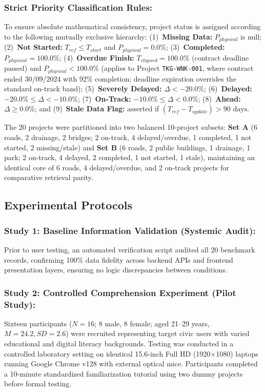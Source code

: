 \documentclass[runningheads]{llncs}
\begin{document}
\subsubsection{Strict Priority Classification Rules:}
To ensure absolute mathematical consistency, project status is assigned according to the following mutually exclusive hierarchy: (1)~\textbf{Missing Data:} $P_{physical}$ is null; (2)~\textbf{Not Started:} $T_{ref} \le T_{start}$ and $P_{physical} = 0.0\%$; (3)~\textbf{Completed:} $P_{physical} = 100.0\%$; (4)~\textbf{Overdue Finish:} $T_{elapsed} = 100.0\%$ (contract deadline passed) and $P_{physical} < 100.0\%$ (applies to Project \texttt{TKG-WNK-001}, where contract ended 30/09/2024 with 92\% completion; deadline expiration overrides the standard on-track band); (5)~\textbf{Severely Delayed:} $\Delta < -20.0\%$; (6)~\textbf{Delayed:} $-20.0\% \le \Delta < -10.0\%$; (7)~\textbf{On-Track:} $-10.0\% \le \Delta < 0.0\%$; (8)~\textbf{Ahead:} $\Delta \ge 0.0\%$; and (9)~\textbf{Stale Data Flag:} asserted if $(T_{ref} - T_{update}) > 90\text{ days}$.

The 20 projects were partitioned into two balanced 10-project subsets: \textbf{Set A} (6 roads, 2 drainage, 2 bridges; 2 on-track, 4 delayed/overdue, 1 completed, 1 not started, 2 missing/stale) and \textbf{Set B} (6 roads, 2 public buildings, 1 drainage, 1 park; 2 on-track, 4 delayed, 2 completed, 1 not started, 1 stale), maintaining an identical core of 6 roads, 4 delayed/overdue, and 2 on-track projects for comparative retrieval parity.

\subsection{Experimental Protocols}

\subsubsection{Study 1: Baseline Information Validation (Systemic Audit):}
Prior to user testing, an automated verification script audited all 20 benchmark records, confirming 100\% data fidelity across backend APIs and frontend presentation layers, ensuring no logic discrepancies between conditions.

\subsubsection{Study 2: Controlled Comprehension Experiment (Pilot Study):}
Sixteen participants ($N = 16$; 8 male, 8 female; aged 21--29 years, $M = 24.2, SD = 2.6$) were recruited representing target civic users with varied educational and digital literacy backgrounds. Testing was conducted in a controlled laboratory setting on identical 15.6-inch Full HD (1920$\times$1080) laptops running Google Chrome v128 with external optical mice. Participants completed a 10-minute standardized familiarization tutorial using two dummy projects before formal testing.
\end{document}
